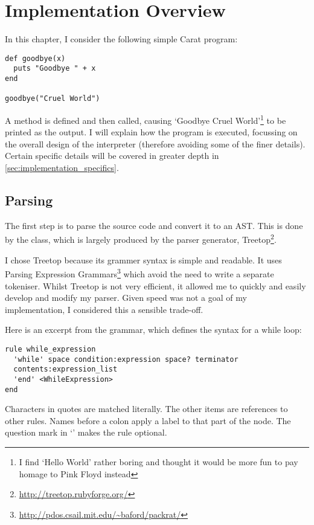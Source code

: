 \chapter{Implementation Overview}

In this chapter, I consider the following simple Carat program:

\begin{lstlisting}
def goodbye(x)
  puts "Goodbye " + x
end

goodbye("Cruel World")
\end{lstlisting}

A  method is defined and then called, causing `Goodbye Cruel World'\footnote{I find `Hello World' rather boring and thought it would be more fun to pay homage to Pink Floyd instead} to be printed as the output. I will explain how the program is executed, focussing on the overall design of the interpreter (therefore avoiding some of the finer details). Certain specific details will be covered in greater depth in \autoref{sec:implementation_specifics}.

\section{Parsing}

The first step is to parse the source code and convert it to an AST. This is done by the \-\- class, which is largely produced by the parser generator, Treetop\footnote{\url{http://treetop.rubyforge.org/}}.

I chose Treetop because its grammer syntax is simple and readable. It uses Parsing Expression Grammars\footnote{\url{http://pdos.csail.mit.edu/~baford/packrat/}} which avoid the need to write a separate tokeniser. Whilst Treetop is not very efficient, it allowed me to quickly and easily develop and modify my parser. Given speed was not a goal of my implementation, I considered this a sensible trade-off.

Here is an excerpt from the grammar, which defines the syntax for a while loop:

\begin{lstlisting}[language=treetop]
rule while_expression
  'while' space condition:expression space? terminator
  contents:expression_list
  'end' <WhileExpression>
end
\end{lstlisting}

Characters in quotes are matched literally. The other items are references to other rules. Names before a colon apply a label to that part of the node. The question mark in `' makes the rule optional.


